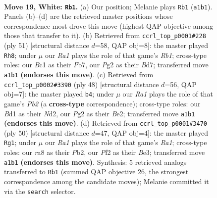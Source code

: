 \documentclass[11pt]{article}
\begin{document}
\clearpage

\begin{figure}[p]\centering
\begin{subfigure}{0.46\textwidth}\centering
\resizebox{\linewidth}{!}{%
\newchessgame
\chessboard[
  setfen={rnb3k1/8/1p4p1/p1p2p2/2P4p/2P5/P4PPP/R1BB2K1 w - - 0 19},
  showmover=false,
  pgfstyle=straightmove, color=movearrow, markmove={a1-b1}
]}
\caption{}
\end{subfigure}\hfill
\begin{subfigure}{0.46\textwidth}\centering
\resizebox{\linewidth}{!}{%
\newchessgame
\chessboard[
  setfen={1r6/1p1bkpb1/p2pp3/7B/2P1PP2/P1N1K1P1/1PR5/8 b - - 2 26},
  showmover=false,
  pgfstyle=straightmove, color=movearrow, markmove={b8-h8}
]}
\caption{}
\end{subfigure}
\\[4pt]
\begin{subfigure}{0.46\textwidth}\centering
\resizebox{\linewidth}{!}{%
\newchessgame
\chessboard[
  setfen={2b3k1/3n2p1/p3pp1p/1p6/5P2/P3P1P1/1P1NBKP1/8 w - - 0 25},
  showmover=false,
  pgfstyle=straightmove, color=movearrow, markmove={b2-b4}
]}
\caption{}
\end{subfigure}\hfill
\begin{subfigure}{0.46\textwidth}\centering
\resizebox{\linewidth}{!}{%
\newchessgame
\chessboard[
  setfen={2r3k1/1p4p1/p2bp1np/P1p5/4P3/2PPB2N/1P2K3/R7 w - - 0 26},
  showmover=false,
  pgfstyle=straightmove, color=movearrow, markmove={a1-g1}
]}
\caption{}
\end{subfigure}
\caption{\textbf{Move 19, White: \texttt{Rb1}.} (a) Our position; Melanie plays \texttt{Rb1} (\texttt{a1b1}). Panels (b)--(d) are the retrieved master positions whose correspondence most drove this move (highest QAP objective among those that transfer to it). (b) Retrieved from \texttt{ccrl\_top\_p0001\#228} (ply 51) [structural distance $d$=58, QAP obj=8]: the master played \texttt{Rh8}; under $\mu$ our \emph{Ra1} plays the role of that game's \emph{Rb1}; cross-type roles: our \emph{B}c1 as their \emph{P}b7, our \emph{P}g2 as their \emph{B}d7; transferred move \texttt{a1b1} \textbf{(endorses this move)}. (c) Retrieved from \texttt{ccrl\_top\_p0002\#3390} (ply 48) [structural distance $d$=56, QAP obj=7]: the master played \texttt{b4}; under $\mu$ our \emph{Ra1} plays the role of that game's \emph{Pb2} (a \textbf{cross-type} correspondence); cross-type roles: our \emph{B}d1 as their \emph{N}d2, our \emph{P}g2 as their \emph{B}e2; transferred move \texttt{a1b1} \textbf{(endorses this move)}. (d) Retrieved from \texttt{ccrl\_top\_p0001\#3470} (ply 50) [structural distance $d$=47, QAP obj=4]: the master played \texttt{Rg1}; under $\mu$ our \emph{Ra1} plays the role of that game's \emph{Ra1}; cross-type roles: our \emph{r}a8 as their \emph{P}b2, our \emph{P}f2 as their \emph{B}e3; transferred move \texttt{a1b1} \textbf{(endorses this move)}. Synthesis: 5 retrieved analogs transferred to \texttt{Rb1} (summed QAP objective 26, the strongest correspondence among the candidate moves); Melanie committed it via the \texttt{search} selector.}
\label{fig:thought-m36}
\end{figure}
\end{document}
